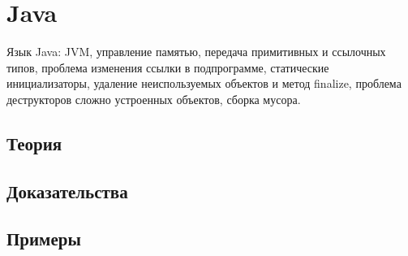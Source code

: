 
\section{Java}
\label{sec:2.3b.03-java}

\begin{ticket}
Язык Java: JVM, управление памятью, передача примитивных и ссылочных типов, проблема изменения ссылки в подпрограмме, статические инициализаторы, удаление неиспользуемых объектов и метод finalize, проблема деструкторов сложно устроенных объектов, сборка мусора.
\end{ticket}

\subsection*{Теория}

\subsection*{Доказательства}

\subsection*{Примеры}
